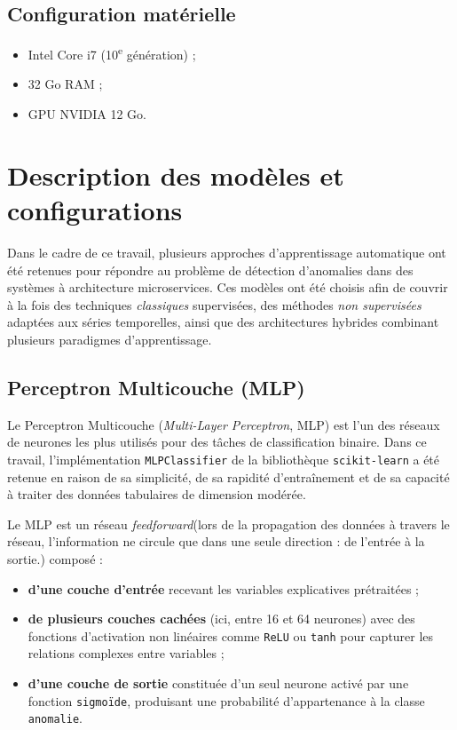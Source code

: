 \documentclass[a4paper,12pt]{report}
\begin{document}
\subsection*{Configuration matérielle}
\begin{itemize}
    \item Intel Core i7 (10\textsuperscript{e} génération) ;
    \item 32 Go RAM ;
    \item GPU NVIDIA 12 Go.
\end{itemize}


\section{Description des modèles et configurations}

Dans le cadre de ce travail, plusieurs approches d’apprentissage automatique ont été retenues pour répondre au problème de détection d’anomalies dans des systèmes à architecture microservices.  
Ces modèles ont été choisis afin de couvrir à la fois des techniques \textit{classiques} supervisées, des méthodes \textit{non supervisées} adaptées aux séries temporelles, ainsi que des architectures hybrides combinant plusieurs paradigmes d’apprentissage.

\subsection{Perceptron Multicouche (MLP)}

Le Perceptron Multicouche (\textit{Multi-Layer Perceptron}, MLP) est l’un des réseaux de neurones les plus utilisés pour des tâches de classification binaire. Dans ce travail, l’implémentation \texttt{MLPClassifier} de la bibliothèque \texttt{scikit-learn} a été retenue en raison de sa simplicité, de sa rapidité d’entraînement et de sa capacité à traiter des données tabulaires de dimension modérée.

Le MLP est un réseau \textit{feedforward}(lors de la propagation des données à travers le réseau, l'information ne circule que dans une seule direction : de l'entrée à la sortie.) composé :
\begin{itemize}
    \item \textbf{d’une couche d’entrée} recevant les variables explicatives prétraitées ;
    \item \textbf{de plusieurs couches cachées} (ici, entre 16 et 64 neurones) avec des fonctions d’activation non linéaires comme \texttt{ReLU} ou \texttt{tanh} pour capturer les relations complexes entre variables ;
    \item \textbf{d’une couche de sortie} constituée d’un seul neurone activé par une fonction \texttt{sigmoïde}, produisant une probabilité d’appartenance à la classe \texttt{anomalie}.
\end{itemize}
\end{document}
